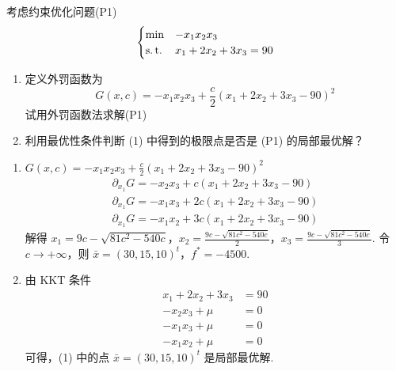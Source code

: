 \begin{problem}
    考虑约束优化问题(P1)\[\begin{cases}
        \min &-x_1x_2x_3\\
        \operatorname{s.t.} &x_1 + 2x_2 + 3x_3 = 90
    \end{cases}\]
    \begin{enumerate}
        \item 定义外罚函数为 \[G(x, c) = -x_1x_2x_3 + \frac{c}{2}(x_1 + 2x_2 + 3x_3 - 90)^2\] 试用外罚函数法求解(P1)
        \item 利用最优性条件判断 (1) 中得到的极限点是否是 (P1) 的局部最优解？
    \end{enumerate}

    \Answer \begin{enumerate}
        \item $G(x, c) = -x_1x_2x_3 + \frac{c}{2}(x_1 + 2x_2 + 3x_3 - 90)^2$
        \begin{align*}
            \partial_{x_1}G = -x_2x_3 + c(x_1 + 2x_2 + 3x_3 - 90)\\
            \partial_{x_1}G = -x_1x_3 + 2c(x_1 + 2x_2 + 3x_3 - 90)\\
            \partial_{x_1}G = -x_1x_2 + 3c(x_1 + 2x_2 + 3x_3 - 90)
        \end{align*}
        解得 $x_1 = 9c - \sqrt{81c^2 - 540c}$，$x_2 = \frac{9c - \sqrt{81c^2 - 540c}}{2}$，$x_3 = \frac{9c - \sqrt{81c^2 - 540c}}{3}$. 令 $c \to +\infty$，则 $\bar{x} = (30, 15, 10)^t$，$f^* = -4500$.
        \item 由 KKT 条件 \begin{align*}
            x_1 + 2x_2 + 3x_3 &= 90\\
            -x_2x_3 + \mu &= 0\\
            -x_1x_3 + \mu &= 0\\
            -x_1x_2 + \mu &= 0
        \end{align*}
        可得，(1) 中的点 $\bar{x} = (30, 15, 10)^t$ 是局部最优解.
    \end{enumerate}
\end{problem}

